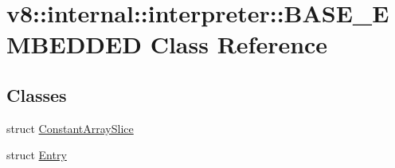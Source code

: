 \hypertarget{classv8_1_1internal_1_1interpreter_1_1_b_a_s_e___e_m_b_e_d_d_e_d}{}\section{v8\+:\+:internal\+:\+:interpreter\+:\+:B\+A\+S\+E\+\_\+\+E\+M\+B\+E\+D\+D\+ED Class Reference}
\label{classv8_1_1internal_1_1interpreter_1_1_b_a_s_e___e_m_b_e_d_d_e_d}
\subsection*{Classes}
\begin{DoxyCompactItemize}
\item 
struct \hyperlink{structv8_1_1internal_1_1interpreter_1_1_b_a_s_e___e_m_b_e_d_d_e_d_1_1_constant_array_slice}{Constant\+Array\+Slice}
\item 
struct \hyperlink{structv8_1_1internal_1_1interpreter_1_1_b_a_s_e___e_m_b_e_d_d_e_d_1_1_entry}{Entry}
\end{DoxyCompactItemize}

